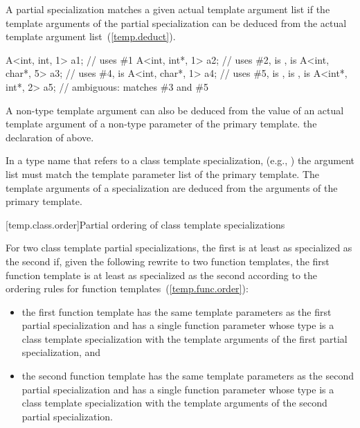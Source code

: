 \pnum
A partial specialization matches a given actual template argument
list if the template arguments of the partial specialization can be
deduced from the actual template argument list~(\ref{temp.deduct}).
\enterexample

\begin{codeblock}
A<int, int, 1>   a1;            // uses \#1
A<int, int*, 1>  a2;            // uses \#2,  is ,  is 
A<int, char*, 5> a3;            // uses \#4,  is 
A<int, char*, 1> a4;            // uses \#5,  is ,  is ,  is 
A<int*, int*, 2> a5;            // ambiguous: matches \#3 and \#5
\end{codeblock}
\exitexampleb

\pnum
A non-type template argument can also be deduced from the value of an actual
template argument of a non-type parameter of the primary template.
\enterexample
the declaration of
above.
\exitexample

\pnum
In a type name that refers to a class template specialization, (e.g.,
)
the argument list must match the template parameter list of the primary
template.
The template arguments of a specialization are deduced from the arguments
of the primary template.

[temp.class.order]{Partial ordering of class template specializations}

\pnum
For two class template partial specializations,
the first is at least as specialized as the second if, given the following
rewrite to two function templates, the first function template is at least
as specialized as the second according to the ordering rules for function
templates~(\ref{temp.func.order}):

\begin{itemize}
\item
the first function template has the same template parameters as
the first partial specialization and has a single function parameter
whose type is a class template specialization with the template arguments of
the first partial specialization, and
\item
the second function template has the same template parameters as
the second partial specialization and has a single function parameter
whose type is a class template specialization with the template arguments of
the second partial specialization.
\end{itemize}

